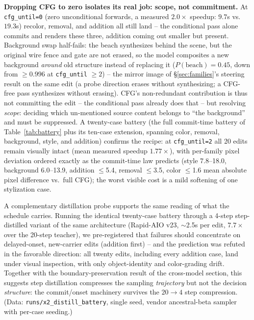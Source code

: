 \documentclass[10pt,twocolumn]{article}
\begin{document}
\textbf{Dropping CFG to zero isolates its real job: scope, not
commitment.} At \texttt{cfg\_until=0} (zero unconditional forwards, a
measured $2.0\times$ speedup: $9.7$s vs.\ $19.3$s) recolor, removal, and
addition all still land -- the conditional pass alone commits and
renders these three, addition coming out smaller but present. Background
swap half-fails: the beach synthesizes behind the scene, but the
original wire fence and gate are not erased, so the model composites a
new background \emph{around} old structure instead of replacing it
($P(\text{beach})=0.45$, down from $\ge0.996$ at \texttt{cfg\_until}
$\ge2$) -- the mirror image of \S\ref{sec:families}'s steering result on
the same edit (a probe direction erases without synthesizing; a
CFG-free pass synthesizes without erasing). CFG's non-redundant
contribution is thus not committing the edit -- the conditional pass
already does that -- but resolving \emph{scope}: deciding which
un-mentioned source content belongs to ``the background'' and must be
suppressed. A twenty-case battery (the full commit-time battery of
Table~\ref{tab:battery} plus its ten-case extension, spanning color,
removal, background, style, and addition) confirms the recipe: at \texttt{cfg\_until=2}
all 20 edits remain visually intact (mean measured speedup
$1.77\times$), with per-family pixel deviation ordered exactly as the
commit-time law predicts (style 7.8--18.0, background 6.0--13.9,
addition $\le$5.4, removal $\le$3.5, color $\le$1.6 mean absolute
pixel difference vs.\ full CFG); the worst visible cost is a mild
softening of one stylization case.

A complementary distillation probe supports the same reading of what the
schedule carries. Running the identical twenty-case battery through a
4-step step-distilled variant of the same architecture (Rapid-AIO v23,
$\sim$2.5s per edit, $7.7\times$ over the 20-step teacher), we
pre-registered that failures should concentrate on delayed-onset,
new-carrier edits (addition first) -- and the prediction was refuted in
the favorable direction: all twenty edits, including every addition
case, land under visual inspection, with only object-identity and
color-grading drift. Together with the boundary-preservation result of
the cross-model section, this suggests step distillation compresses the
sampling \emph{trajectory} but not the decision \emph{structure}: the
commit/onset machinery survives the $20\!\to\!4$ step compression.
(Data: \texttt{runs/x2\_distill\_battery}, single seed, vendor
ancestral-beta sampler with per-case seeding.)
\end{document}
